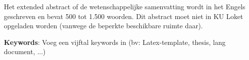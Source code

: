 Het extended abstract of de wetenschappelijke samenvatting wordt in het Engels geschreven en bevat 500 tot 1.500 woorden. Dit abstract moet niet in KU Loket opgeladen worden (vanwege de beperkte beschikbare ruimte daar).

\textbf{Keywords}: Voeg een vijftal keywords in (bv: Latex-template, thesis, lang document, ...)
